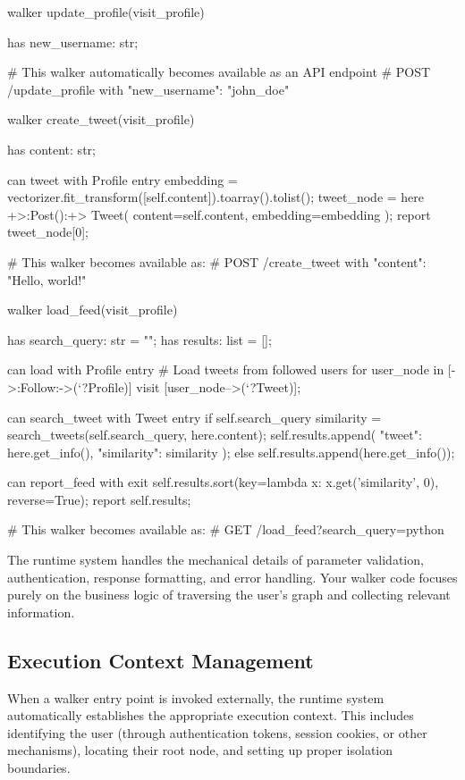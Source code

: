 \begin{jacblock}
walker update_profile(visit_profile) {
    has new_username: str;

    # This walker automatically becomes available as an API endpoint
    # POST /update_profile with {"new_username": "john_doe"}
}

walker create_tweet(visit_profile) {
    has content: str;

    can tweet with Profile entry {
        embedding = vectorizer.fit_transform([self.content]).toarray().tolist();
        tweet_node = here +>:Post():+> Tweet(
            content=self.content,
            embedding=embedding
        );
        report tweet_node[0];
    }

    # This walker becomes available as:
    # POST /create_tweet with {"content": "Hello, world!"}
}

walker load_feed(visit_profile) {
    has search_query: str = "";
    has results: list = [];

    can load with Profile entry {
        # Load tweets from followed users
        for user_node in [->:Follow:->(`?Profile)] {
            visit [user_node-->(`?Tweet)];
        }
    }

    can search_tweet with Tweet entry {
        if self.search_query {
            similarity = search_tweets(self.search_query, here.content);
            self.results.append({
                "tweet": here.get_info(),
                "similarity": similarity
            });
        } else {
            self.results.append(here.get_info());
        }
    }

    can report_feed with exit {
        self.results.sort(key=lambda x: x.get('similarity', 0), reverse=True);
        report self.results;
    }

    # This walker becomes available as:
    # GET /load_feed?search_query=python
}
\end{jacblock}

The runtime system handles the mechanical details of parameter validation, authentication, response formatting, and error handling. Your walker code focuses purely on the business logic of traversing the user's graph and collecting relevant information.

\subsection{Execution Context Management}

When a walker entry point is invoked externally, the runtime system automatically establishes the appropriate execution context. This includes identifying the user (through authentication tokens, session cookies, or other mechanisms), locating their root node, and setting up proper isolation boundaries.

